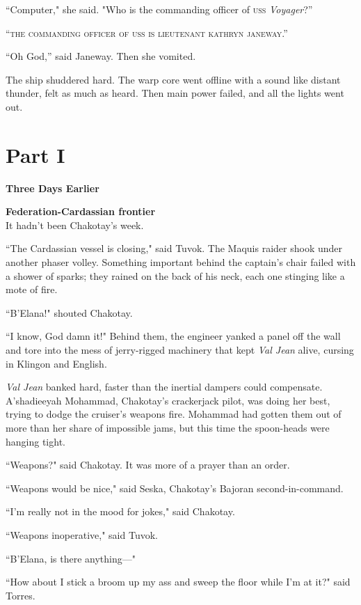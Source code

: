 \documentclass[twoside,letterpaper,12pt]{memoir}
\begin{document}
``Computer," she said. "Who is the commanding officer of \textsc{uss} \textit{Voyager}?''

``\textsc{the commanding officer of uss}  \textsc{is lieutenant kathryn janeway}.''

``Oh God,'' said Janeway. Then she vomited.

The ship shuddered hard. The warp core went offline with a sound like distant thunder, felt as much as heard. Then main power failed, and all the lights went out.

\chapter*{Part I}

\textbf{Three Days Earlier }

\noindent\textbf{Federation-Cardassian frontier}\\

\noindent It hadn't been Chakotay's week.

``The Cardassian vessel is closing," said Tuvok. The Maquis raider shook under another phaser volley. Something important behind the captain's chair failed with a shower of sparks; they rained on the back of his neck, each one stinging like a mote of fire.

``B'Elana!" shouted Chakotay.

``I know, God damn it!" Behind them, the engineer yanked a panel off the wall and tore into the mess of jerry-rigged machinery that kept \textit{Val Jean} alive, cursing in Klingon and English.

\textit{Val Jean} banked hard, faster than the inertial dampers could compensate. A'shadieeyah Mohammad, Chakotay's crackerjack pilot, was doing her best, trying to dodge the cruiser's weapons fire. Mohammad had gotten them out of more than her share of impossible jams, but this time the spoon-heads were hanging tight.

``Weapons?" said Chakotay. It was more of a prayer than an order.

``Weapons would be nice," said Seska, Chakotay's Bajoran second-in-command.

``I'm really not in the mood for jokes," said Chakotay.

``Weapons inoperative," said Tuvok.

``B'Elana, is there anything---"

``How about I stick a broom up my ass and sweep the floor while I'm at it?" said Torres.
\end{document}
